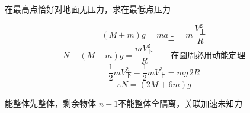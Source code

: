 \begin{problem}
在最高点恰好对地面无压力，求在最低点压力
\begin{solution}
\[ (M+m)g=ma_{\text{上}}=m\,\frac{V_{\text{上}}^2}{R} \]
\[ N-(M+m)g=\frac{mV_{\text{下}}^2}{R}\qquad \text{在圆周必用动能定理} \]
\[ \frac12mV_{\text{下}}^2-\frac12mV_{\text{上}}^2=mg\,2R \]
\[ \therefore N=(2M+6m)g \]
\end{solution}
\end{problem}
\noindent 能整体先整体，剩余物体 $n-1$\quad 不能整体全隔离，关联加速未知力
